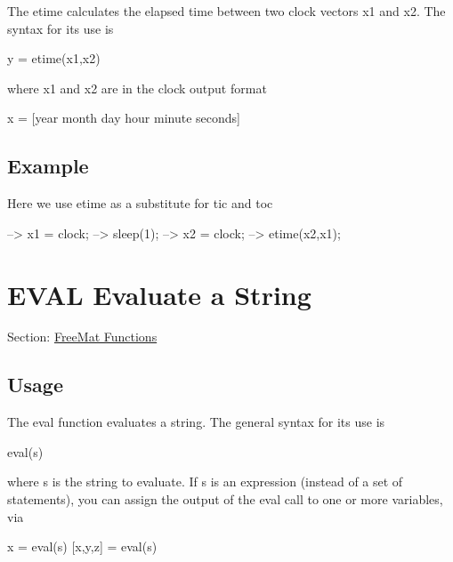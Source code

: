 The {\ttfamily etime} calculates the elapsed time between two {\ttfamily clock} vectors {\ttfamily x1} and {\ttfamily x2}. The syntax for its use is \begin{DoxyVerb}   y = etime(x1,x2)
\end{DoxyVerb}
 where {\ttfamily x1} and {\ttfamily x2} are in the {\ttfamily clock} output format \begin{DoxyVerb}   x = [year month day hour minute seconds]
\end{DoxyVerb}
 \hypertarget{variables_struct_Example}{}\subsection{Example}\label{variables_struct_Example}
Here we use {\ttfamily etime} as a substitute for {\ttfamily tic} and {\ttfamily toc}


\begin{DoxyVerbInclude}
--> x1 = clock;
--> sleep(1);
--> x2 = clock;
--> etime(x2,x1);
\end{DoxyVerbInclude}
 \hypertarget{freemat_eval}{}\section{E\-V\-A\-L Evaluate a String}\label{freemat_eval}
Section\-: \hyperlink{sec_freemat}{Free\-Mat Functions} \hypertarget{vtkwidgets_vtkxyplotwidget_Usage}{}\subsection{Usage}\label{vtkwidgets_vtkxyplotwidget_Usage}
The {\ttfamily eval} function evaluates a string. The general syntax for its use is \begin{DoxyVerb}   eval(s)
\end{DoxyVerb}
 where {\ttfamily s} is the string to evaluate. If {\ttfamily s} is an expression (instead of a set of statements), you can assign the output of the {\ttfamily eval} call to one or more variables, via \begin{DoxyVerb}   x = eval(s)
   [x,y,z] = eval(s)
\end{DoxyVerb}


